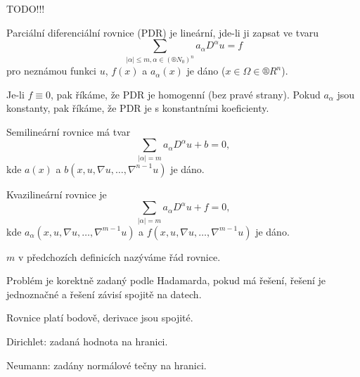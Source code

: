 \documentclass[12pt]{article}					%
\begin{document}

TODO!!!


\begin{definice}
	Parciální diferenciální rovnice (PDR) je lineární, jde-li ji zapsat ve tvaru
	$$ \sum_{|\alpha| ≤ m, \alpha \in (®N_0)^n} a_\alpha D^{\alpha} u = f $$
	pro neznámou funkci $u$, $f(x)$ a $a_\alpha(x)$ je dáno ($x \in \Omega \in ®R^n$).

	Je-li $f ≡ 0$, pak říkáme, že PDR je homogenní (bez pravé strany). Pokud $a_\alpha$ jsou konstanty, pak říkáme, že PDR je s konstantními koeficienty.
\end{definice}

\begin{definice}
	Semilineární rovnice má tvar
	$$ \sum_{|\alpha| = m} a_{\alpha} D^\alpha u + b = 0, $$
	kde $a(x)$ a $b(x, u, \nabla u, …, \nabla^{n-1} u)$ je dáno.
\end{definice}

\begin{definice}
	Kvazilineární rovnice je
	$$ \sum_{|\alpha| = m} a_{\alpha} D^\alpha u + f = 0, $$
	kde $a_\alpha(x, u, \nabla u, …, \nabla^{m-1} u)$ a $f(x, u, \nabla u, …, \nabla^{m-1} u)$ je dáno.
\end{definice}

\begin{definice}
	$m$ v předchozích definicích nazýváme řád rovnice.
\end{definice}

\begin{definice}
	Problém je korektně zadaný podle Hadamarda, pokud má řešení, řešení je jednoznačné a řešení závisí spojitě na datech.
\end{definice}

\begin{definice}
	Rovnice platí bodově, derivace jsou spojité.
\end{definice}

\begin{definice}
	Dirichlet: zadaná hodnota na hranici.

	Neumann: zadány normálové tečny na hranici.
\end{definice}
\end{document}
